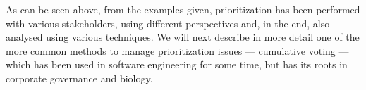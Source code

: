 As can be seen above, from the examples given, prioritization has been performed with various stakeholders, using different perspectives and, in the end, also analysed using various techniques. We will next describe in more detail one of the more common methods to manage prioritization issues --- cumulative voting --- which has been used in software engineering for some time, but has its roots in corporate governance and biology.